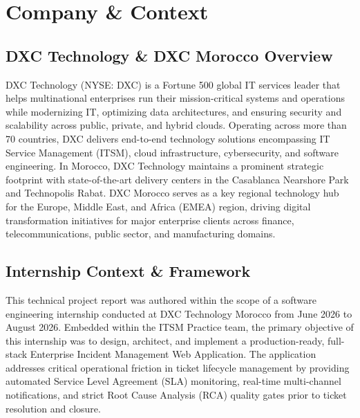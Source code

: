 \documentclass[12pt,a4paper]{report}
\begin{document}
\tableofcontents
\newpage

\chapter{Company \& Context}

\section{DXC Technology \& DXC Morocco Overview}
DXC Technology (NYSE: DXC) is a Fortune 500 global IT services leader that helps multinational enterprises run their mission-critical systems and operations while modernizing IT, optimizing data architectures, and ensuring security and scalability across public, private, and hybrid clouds. Operating across more than 70 countries, DXC delivers end-to-end technology solutions encompassing IT Service Management (ITSM), cloud infrastructure, cybersecurity, and software engineering. In Morocco, DXC Technology maintains a prominent strategic footprint with state-of-the-art delivery centers in the Casablanca Nearshore Park and Technopolis Rabat. DXC Morocco serves as a key regional technology hub for the Europe, Middle East, and Africa (EMEA) region, driving digital transformation initiatives for major enterprise clients across finance, telecommunications, public sector, and manufacturing domains.

\section{Internship Context \& Framework}
This technical project report was authored within the scope of a software engineering internship conducted at DXC Technology Morocco from June 2026 to August 2026. Embedded within the ITSM Practice team, the primary objective of this internship was to design, architect, and implement a production-ready, full-stack Enterprise Incident Management Web Application. The application addresses critical operational friction in ticket lifecycle management by providing automated Service Level Agreement (SLA) monitoring, real-time multi-channel notifications, and strict Root Cause Analysis (RCA) quality gates prior to ticket resolution and closure.
\end{document}

